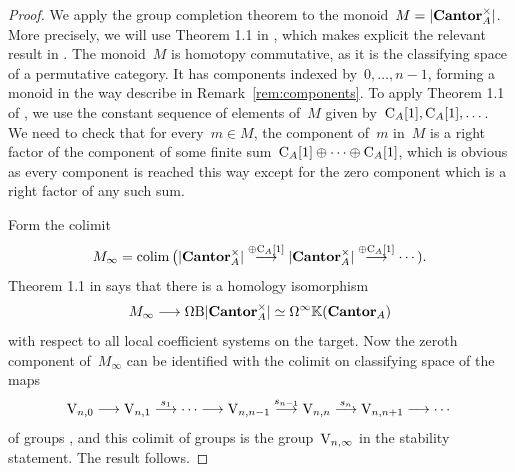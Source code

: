 \begin{proof}
We apply the group completion theorem to the monoid~$M=|\mathbf{Cantor}_A^\times|$. More precisely, we will 
use Theorem 1.1 in \cite{Randal-Williams}, which makes explicit the relevant result in \cite{McDuff-Segal}. 
The monoid~$M$ is homotopy commutative, as it is the classifying space of a permutative category. 
It has components indexed by~$0,\dots,n-1$, forming a monoid in the way describe in Remark~\ref{rem:components}. To apply Theorem 1.1 of  \cite{Randal-Williams}, we use the constant sequence of elements of~$M$ given by~$\mathrm{C}_A[1],\mathrm{C}_A[1],\dots$. 
We need to check that for every~$m\in M$, the component of~$m$ in~$M$ is a right factor of the component of some finite sum~$\mathrm{C}_A[1]\oplus \dots\oplus \mathrm{C}_A[1]$, which is obvious as every component is reached this way except for the zero component which is a right factor of any such sum. 

Form  the colimit 
\[
M_\infty=\operatorname*{colim}\big(|\mathbf{Cantor}^\times_A|\stackrel{\oplus \mathrm{C}_A[1]}{\longrightarrow} |\mathbf{Cantor}^\times_A|\stackrel{\oplus \mathrm{C}_A[1]}{\longrightarrow}\cdots).
\]
Theorem 1.1 in \cite{Randal-Williams} says that there is a homology isomorphism
\[
M_\infty\longrightarrow\Omega\mathrm{B}|\mathbf{Cantor}^\times_A|\simeq \Omega^\infty\mathbb{K}(\mathbf{Cantor}_A)
\]
with respect to all local coefficient systems on the target.  
Now the zeroth component of~$M_\infty$ can be identified with the colimit on classifying space of the maps 
\[
\mathrm{V}_{n,0}\longrightarrow\mathrm{V}_{n,1}\stackrel{s_1}\longrightarrow\cdots\longrightarrow \mathrm{V}_{n,n-1} \stackrel{s_{n-1}}\longrightarrow\mathrm{V}_{n,n} \stackrel{s_n}\longrightarrow\mathrm{V}_{n,n+1}\longrightarrow\cdots
\]
of groups , and this colimit of groups is the group~$\mathrm{V}_{n,\infty}$ in the stability statement. The result follows. 
\end{proof}



